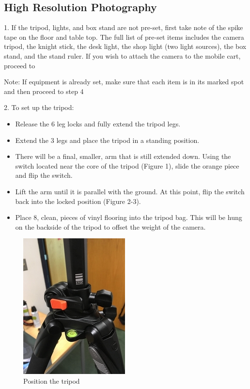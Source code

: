 \subsection{High Resolution Photography}

1. 	If the tripod, lights, and box stand are not pre-set, first take note of the spike tape on the floor and table top. The full list of pre-set items includes the camera tripod, the knight stick, the desk light, the shop light (two light sources), the box stand, and the stand ruler. If you wish to attach the camera to the mobile cart, proceed to 

Note: If equipment is already set, make sure that each item is in its marked spot and then proceed to step 4

2. To set up the tripod:

\begin{itemize}
  \item Release the 6 leg locks and fully extend the tripod legs.
  \item Extend the 3 legs and place the tripod in a standing position. 
  \item There will be a final, smaller, arm that is still extended down. Using the switch located near the core of the tripod (Figure 1), slide the orange piece and flip the switch. 
  \item Lift the arm until it is parallel with the ground. At this point, flip the switch back into the locked position (Figure 2-3). 
  \item Place 8, clean, pieces of vinyl flooring into the tripod bag. This will be hung on the backside of the tripod to offset the weight of the camera. 
\end{itemize} 

\begin{figure}[!htp]
\centering
\includegraphics[scale=2]{Lock_1}
\caption{Position the tripod}
\label{Figure 1}
\end{figure}


